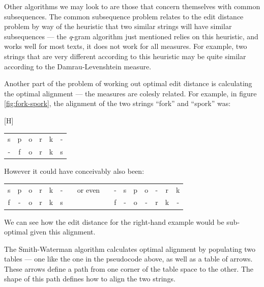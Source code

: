 \documentclass[a4paper,11pt,twoside,notitlepage]{article}
\begin{document}
        Other algorithms we may look to are those that concern
        themselves with common subsequences. The common subsequence
        problem relates to the edit distance problem by way of the
        heuristic that two similar strings will have similar
        subsequences --- the \textit{q}-gram algorithm just mentioned
        relies on this heuristic, and works well for most texts,
        it does not work for all measures. For example, two strings
        that are very different according to this heuristic may be
        quite similar according to the Damrau-Levenshtein measure.

        Another part of the problem of working out optimal edit
        distance is calculating the optimal alignment --- the measures
        are colesly related. For example, in
        figure \ref{fig:fork-spork}, the alignment of the two strings
        ``fork'' and ``spork'' was:\\
        \begin{center}[H]
          \begin{tabular}{cccccc}
            s & p & o & r & k & -\\
            - & f & o & r & k & s 
          \end{tabular}
        \end{center}
        However it could have conceivably also been:
        \begin{center}
          \begin{tabular}{cccccccccccccccc}
            s & p & o & r & k & - & & or even & & - & s & p & o & - & r & k \\
            f & - & o & r & k & s & &         & & f & - & o & - & r & k & -    
          \end{tabular}
        \end{center}
        We can see how the edit distance for the right-hand example
        would be sub-optimal given this alignment.

        The Smith-Waterman algorithm\cite{Smith1981} calculates
        optimal alignment by populating two tables --- one like the
        one in the pseudocode above, as well as a table of
        arrows. These arrows define a path from one corner of the
        table space to the other. The shape of this path defines how
        to align the two strings.
\end{document}
